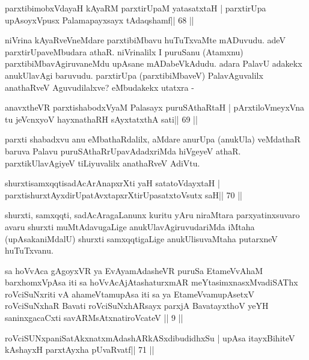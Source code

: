 \begin{shl}
parxtibimobxVdayaH kAyaRM parxtirUpaM yatasatxtaH |
parxtirUpa upAsoyxV\s pusx Palamapayxsayx tAdaqshamf\hfill || 68 ||
\end{shl}

\begin{artha}
niVrina kAyaRveVneMdare parxtibiMbavu huTuTxvaMte mADuvudu. adeV parxtirUpaveMbudara athaR. niVrinalilx I puruSanu (Atamxnu) parxtibiMbavAgiruvaneMdu upAsane mADabeVkAdudu. adara PalavU adakekx anukUlavAgi baruvudu. parxtirUpa (parxtibiMbaveV) PalavAguvalilx anathaRveV Aguvudilalxve? eMbudakekx utatxra - 
\end{artha}

\begin{shl}
anavxtheVR parxtishabodxV\s yaM Palasayx puruSAthaRtaH |
pArxtiloVmeyxVna tu jeVcnxyoV hayxnathaRH sAyxtatxthA sati\hfill || 69 ||
\end{shl}

\begin{artha}
parxti shabadxvu anu eMbathaRdalilx, aMdare anurUpa (anukUla) veMdathaR  baruva Palavu puruSAthaRrUpavAdadxriMda hiVgeyeV athaR. parxtikUlavAgiyeV tiLiyuvalilx anathaRveV AdiVtu.
\end{artha}

\begin{shl}
shurxtisamxqqtisadAcArAnapxrXti yaH satatoVdayxtaH |
parxtishurxtAyxdirUpatAvxtapxrXtirUpasatxtoV\s sutx saH\hfill || 70 ||
\end{shl}

\begin{artha}
shurxti, samxqqti, sadAcAragaLanunx kuritu yAru niraMtara parxyatinxsuvaro avaru shurxti muMtAdavugaLige anukUlavAgiruvudariMda iMtaha (upAsakaniMdalU) shurxti samxqqtigaLige anukUlisuvaMtaha putarxneV huTuTxvanu.
\end{artha}


\begin{kandikeshl}
sa hoVvAca gAgoyxVR ya EvAyamAdasheVR puruSa EtameVvAhaM barxhomxVpAsa iti sa hoVvAcAjAtashaturxmAR meYtasimxnasxMvadiSAThx roVciSuNxriti vA ahameVtamupAsa iti sa ya EtameVvamupAsetxV roVciSuNxhaR Bavati roVciSuNxhARsayx parxjA BavatayxthoV yeYH saninxgacaCxti savARMsAtxnatiroVcateV || 9 ||
\end{kandikeshl}


\begin{shl}
roVciSUNxpaniSatAkxnatxmAdashARkASxdibudidhxSu |
upAsa itayxBihiteV kAshayxH parxtAyxha pUvaRvatf\hfill || 71 ||
\end{shl}


